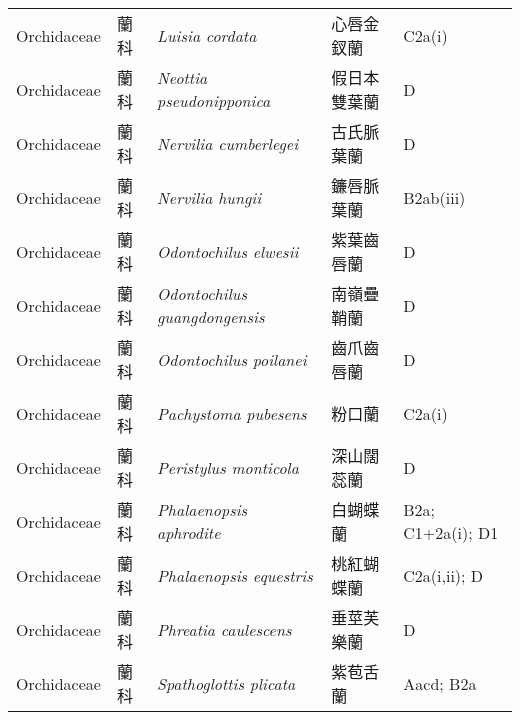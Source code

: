 {\begin{longtable}{p{2.5cm}p{2.5cm}p{4.5cm}p{2.5cm}p{3cm}}
    Orchidaceae & 蘭科 & \textit{Luisia cordata}  & 心唇金釵蘭 & C2a(i) \index{Luisia@\textit{Luisia}!cordata@\textit{cordata}}  \index{心唇金釵蘭} \\
    Orchidaceae & 蘭科 & \textit{Neottia pseudonipponica}  & 假日本雙葉蘭 & D \index{Neottia@\textit{Neottia}!pseudonipponica@\textit{pseudonipponica}}  \index{假日本雙葉蘭} \\
    Orchidaceae & 蘭科 & \textit{Nervilia cumberlegei}  & 古氏脈葉蘭 & D \index{Nervilia@\textit{Nervilia}!cumberlegei@\textit{cumberlegei}}  \index{古氏脈葉蘭} \\
    Orchidaceae & 蘭科 & \textit{Nervilia hungii}  & 鐮唇脈葉蘭 & B2ab(iii) \index{Nervilia@\textit{Nervilia}!hungii@\textit{hungii}}  \index{鐮唇脈葉蘭} \\
    Orchidaceae & 蘭科 & \textit{Odontochilus elwesii}  & 紫葉齒唇蘭 & D \index{Odontochilus@\textit{Odontochilus}!elwesii@\textit{elwesii}}  \index{紫葉齒唇蘭} \\
    Orchidaceae & 蘭科 & \textit{Odontochilus guangdongensis}  & 南嶺疊鞘蘭 & D \index{Odontochilus@\textit{Odontochilus}!guangdongensis@\textit{guangdongensis}}  \index{南嶺疊鞘蘭} \\
    Orchidaceae & 蘭科 & \textit{Odontochilus poilanei}  & 齒爪齒唇蘭 & D \index{Odontochilus@\textit{Odontochilus}!poilanei@\textit{poilanei}}  \index{齒爪齒唇蘭} \\
    Orchidaceae & 蘭科 & \textit{Pachystoma pubesens}  & 粉口蘭 & C2a(i) \index{Pachystoma@\textit{Pachystoma}!pubesens@\textit{pubesens}}  \index{粉口蘭} \\
    Orchidaceae & 蘭科 & \textit{Peristylus monticola}  & 深山闊蕊蘭 & D \index{Peristylus@\textit{Peristylus}!monticola@\textit{monticola}}  \index{深山闊蕊蘭} \\
    Orchidaceae & 蘭科 & \textit{Phalaenopsis aphrodite}  & 白蝴蝶蘭 & B2a; C1+2a(i); D1 \index{Phalaenopsis@\textit{Phalaenopsis}!aphrodite@\textit{aphrodite}}  \index{白蝴蝶蘭} \\
    Orchidaceae & 蘭科 & \textit{Phalaenopsis equestris}  & 桃紅蝴蝶蘭 & C2a(i,ii); D \index{Phalaenopsis@\textit{Phalaenopsis}!equestris@\textit{equestris}}  \index{桃紅蝴蝶蘭} \\
    Orchidaceae & 蘭科 & \textit{Phreatia caulescens}  & 垂莖芙樂蘭 & D \index{Phreatia@\textit{Phreatia}!caulescens@\textit{caulescens}}  \index{垂莖芙樂蘭} \\
    Orchidaceae & 蘭科 & \textit{Spathoglottis plicata}  & 紫苞舌蘭 & Aacd; B2a \index{Spathoglottis@\textit{Spathoglottis}!plicata@\textit{plicata}}  \index{紫苞舌蘭} \\

\end{longtable}}
